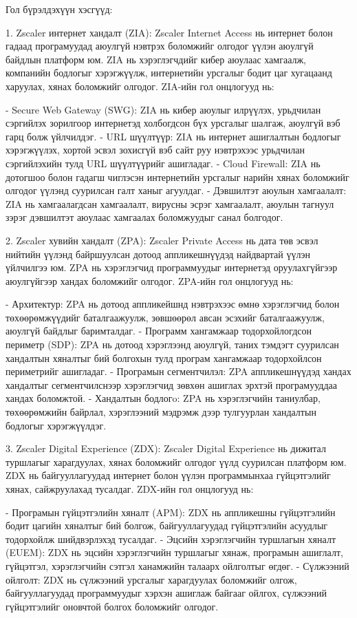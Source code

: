 					Гол бүрэлдэхүүн хэсгүүд:
					
					1. Zscaler интернет хандалт (ZIA): Zscaler Internet Access нь интернет болон гадаад програмуудад аюулгүй нэвтрэх боломжийг олгодог үүлэн аюулгүй байдлын платформ юм. ZIA нь хэрэглэгчдийг кибер аюулаас хамгаалж, компанийн бодлогыг хэрэгжүүлж, интернетийн урсгалыг бодит цаг хугацаанд харуулах, хянах боломжийг олгодог. ZIA-ийн гол онцлогууд нь:
					
							- Secure Web Gateway (SWG): ZIA нь кибер аюулыг илрүүлэх, урьдчилан сэргийлэх зорилгоор интернетэд холбогдсон бүх урсгалыг шалгаж, аюулгүй вэб гарц болж үйлчилдэг.
							- URL шүүлтүүр: ZIA нь интернет ашиглалтын бодлогыг хэрэгжүүлэх, хортой эсвэл зохисгүй вэб сайт руу нэвтрэхээс урьдчилан сэргийлэхийн тулд URL шүүлтүүрийг ашигладаг.
							- Cloud Firewall: ZIA нь дотогшоо болон гадагш чиглэсэн интернетийн урсгалыг нарийн хянах боломжийг олгодог үүлэнд суурилсан галт ханыг агуулдаг.
							- Дэвшилтэт аюулын хамгаалалт: ZIA нь хамгаалагдсан хамгаалалт, вирусны эсрэг хамгаалалт, аюулын тагнуул зэрэг дэвшилтэт аюулаас хамгаалах боломжуудыг санал болгодог.
					
					2. Zscaler хувийн хандалт (ZPA): Zscaler Private Access нь дата төв эсвэл нийтийн үүлэнд байршуулсан дотоод аппликешнүүдэд найдвартай үүлэн үйлчилгээ юм. ZPA нь хэрэглэгчид программуудыг интернетэд оруулахгүйгээр аюулгүйгээр хандах боломжийг олгодог. ZPA-ийн гол онцлогууд нь:
					
							- Архитектур: ZPA нь дотоод аппликейшнд нэвтрэхээс өмнө хэрэглэгчид болон төхөөрөмжүүдийг баталгаажуулж, зөвшөөрөл авсан эсэхийг баталгаажуулж, аюулгүй байдлыг баримталдаг.
							- Программ хангамжаар тодорхойлогдсон периметр (SDP): ZPA нь дотоод хэрэглээнд аюулгүй, таних тэмдэгт суурилсан хандалтын хяналтыг бий болгохын тулд програм хангамжаар тодорхойлсон периметрийг ашигладаг.
							- Програмын сегментчилэл: ZPA аппликешнүүдэд хандах хандалтыг сегментчилснээр хэрэглэгчид зөвхөн ашиглах эрхтэй програмууддаа хандах боломжтой.
							- Хандалтын бодлогo: ZPA нь хэрэглэгчийн таниулбар, төхөөрөмжийн байрлал, хэрэглээний мэдрэмж дээр тулгуурлан хандалтын бодлогыг хэрэгжүүлдэг.
					
					3. Zscaler Digital Experience (ZDX): Zscaler Digital Experience нь дижитал туршлагыг харагдуулах, хянах боломжийг олгодог үүлд суурилсан платформ юм. ZDX нь байгууллагуудад интернет болон үүлэн программынхаа гүйцэтгэлийг хянах, сайжруулахад тусалдаг. ZDX-ийн гол онцлогууд нь:
					
							- Програмын гүйцэтгэлийн хяналт (APM): ZDX нь аппликешны гүйцэтгэлийн бодит цагийн хяналтыг бий болгож, байгууллагуудад гүйцэтгэлийн асуудлыг тодорхойлж шийдвэрлэхэд тусалдаг.
							- Эцсийн хэрэглэгчийн туршлагын хяналт (EUEM): ZDX нь эцсийн хэрэглэгчийн туршлагыг хянаж, програмын ашиглалт, гүйцэтгэл, хэрэглэгчийн сэтгэл ханамжийн талаарх ойлголтыг өгдөг.
							- Сүлжээний ойлголт: ZDX нь сүлжээний урсгалыг харагдуулах боломжийг олгож, байгууллагуудад программуудыг хэрхэн ашиглаж байгааг ойлгох, сүлжээний гүйцэтгэлийг оновчтой болгох боломжийг олгодог.
					
